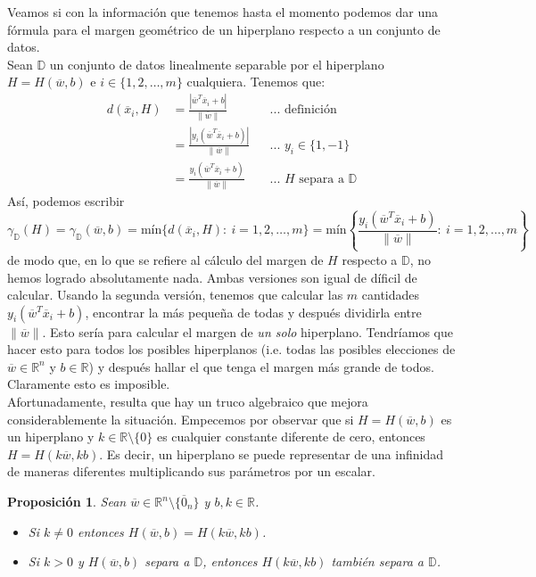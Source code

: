 \documentclass[11pt]{article}
\newtheorem{proposition}{Proposición}[section]
\newcommand{\R}{\mathbb{R}}
\newcommand{\Rn}{\R^{n}}
\newcommand{\wv}{\overline{w}}
\newcommand{\x}{\overline{x}}
\newcommand{\z}{\overline{0}_{n}}
\newcommand{\Rnz}{\Rn\setminus\{\z\}}
\newcommand{\Sm}{1,2,\ldots, m}
\newcommand{\Dat}{\mathbb{D}}
\newcommand{\nw}{\|\wv\|}
\begin{document}
Veamos si con la información que tenemos hasta el momento podemos dar una fórmula para el margen geométrico de un hiperplano respecto a un conjunto de datos.\\
Sean $\Dat$ un conjunto de datos linealmente separable por el hiperplano $H=H(\wv, b)$ e $i\in\{1,2,\ldots,m\}$ cualquiera. Tenemos que:
\begin{equation*}
\begin{aligned}
d(\x_{i}, H)&=\frac{|\wv^{T}\x_{i}+b|}{\nw} &&\text{... definición}\\
&=\frac{|y_{i}(\wv^{T}\x_{i}+b)|}{\nw} &&\text{... $y_{i}\in\{1,-1\}$}\\
&=\frac{y_{i}(\wv^{T}\x_{i}+b)}{\nw} &&\text{... $H$ separa a $\Dat$}
\end{aligned}
\end{equation*}
Así, podemos escribir
$$\gamma_{\Dat}(H)=\gamma_{\Dat}(\wv, b)=\text{mín}\{d(\x_{i}, H):\ i=\Sm\}=\text{mín}\left\{\frac{y_{i}(\wv^{T}\x_{i}+b)}{\nw}:\ i=\Sm\right\}$$
de modo que, en lo que se refiere al cálculo del margen de $H$ respecto a $\Dat$, no hemos logrado absolutamente nada. Ambas versiones son igual de díficil de calcular. Usando la segunda versión, tenemos que calcular las $m$ cantidades $y_{i}(\wv ^{T}\x_{i}+b)$, encontrar la más pequeña de todas y después dividirla entre $\nw$. Esto sería para calcular el margen de \emph{un solo} hiperplano. Tendríamos que hacer esto para todos los posibles hiperplanos (i.e. todas las posibles elecciones de $\wv\in\Rn$ y $b\in\R$) y después hallar el que tenga el margen más grande de todos. Claramente esto es imposible.\\

Afortunadamente, resulta que hay un truco algebraico que mejora considerablemente la situación. Empecemos por observar que si $H=H(\wv, b)$ es un hiperplano y $k\in\R\setminus\{0\}$ es cualquier constante diferente de cero, entonces $H=H(k\wv,k b)$. Es decir, un hiperplano se puede representar de una infinidad de maneras diferentes multiplicando sus parámetros por un escalar.

\begin{proposition}
Sean $\wv\in\Rnz$ y $b, k\in\R$.
\begin{itemize}
\item[(i)] Si $k\ne0$ entonces $H(\wv, b)=H(k\wv, kb)$.
\item[(ii)] Si $k>0$ y $H(\wv, b)$ separa a $\Dat$, entonces $H(k\wv, kb)$ también separa a $\Dat$.
\end{itemize}
\end{proposition}
\end{document}
